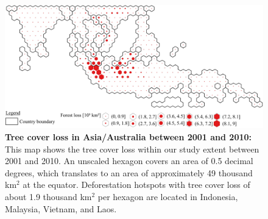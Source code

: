 			\begin{figure}[ht]
				\centering
				\includegraphics[scale=1.]{img/asia_loss_frameless}
				\caption[Tree cover loss in Asia/Australia between 2001 and 2010]{\textbf{Tree cover loss in Asia/Australia between 2001 and 2010:} This map shows the tree cover loss within our study extent between 2001 and 2010. An unscaled hexagon covers an area of 0.5 decimal degrees, which translates to an area of approximately 49 thousand km$^2$ at the equator. Deforestation hotspots with tree cover loss of about 1.9 thousand km$^2$ per hexagon are located in Indonesia, Malaysia, Vietnam, and Laos.}
				\label{fig:asia_loss}
			\end{figure}

